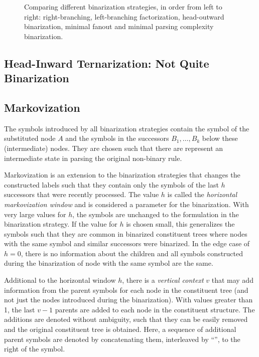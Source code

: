 \documentclass[../document.tex]{subfiles}
\begin{document}
    \begin{figure}
        \caption{\label{fig:ex:binarization}
            Comparing different binarization strategies, in order from left to right: right-branching, left-branching factorization, head-outward binarization, minimal fanout and minimal parsing complexity binarization.}
    \end{figure}

    \subsection{Head-Inward Ternarization: Not Quite Binarization} \label{sec:extraction:bin:hi}


    \subsection{Markovization}
    The symbols introduced by all binarization strategies contain the symbol of the substituted node \(A\) and the symbols in the successors \(B_1, \ldots, B_k\) below these (intermediate) nodes.
    They are chosen such that there are represent an intermediate state in parsing the original non-binary rule.

    Markovization is an extension to the binarization strategies that changes the constructed labels such that they contain only the symbols of the last \(h\) successors that were recently processed.
    The value \(h\) is called the \emph{horizontal markovization window} and is considered a parameter for the binarization.
    With very large values for \(h\), the symbols are unchanged to the formulation in the binarization strategy.
    If the value for \(h\) is chosen small, this generalizes the symbols such that they are common in binarized constituent trees where nodes with the same symbol and similar successors were binarized.
    In the edge case of \(h=0\), there is no information about the children and all symbols constructed during the binarization of node with the same symbol are the same.

    Additional to the horizontal window \(h\), there is a \emph{vertical context} \(v\) that may add information from the parent symbols for each node in the constituent tree (and not just the nodes introduced during the binarization).
    With values greater than 1, the last \(v-1\) parents are added to each node in the constituent structure.
    The additions are denoted without ambiguity, such that they can be easily removed and the original constituent tree is obtained.
    Here, a sequence of additional parent symbols are denoted by concatenating them, interleaved by ``\cn{$\wedge$}'', to the right of the symbol.
\end{document}
